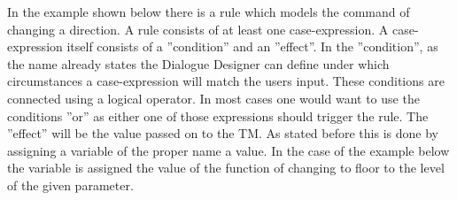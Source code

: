 \documentclass[a4paper, 12pt]{article}
\begin{document}
In the example shown below there is a rule which models the command of changing a direction.
A rule consists of at least one case-expression.
A case-expression itself consists of a ”condition” and an ”effect”.
 In the ”condition”, as the name already states the Dialogue Designer can define under which circumstances a case-expression will match the users input.
 These conditions are connected using a logical operator.
 In most cases one would want to use the conditions ”or” as either one of those expressions should trigger the rule.
  The ”effect” will be the value passed on to the TM.
  As stated before this is done by assigning a variable of the proper name a value.
  In the case of the example below the variable is assigned the value of the function of changing to floor to the level of the given parameter. 
  \newline
\end{document}

